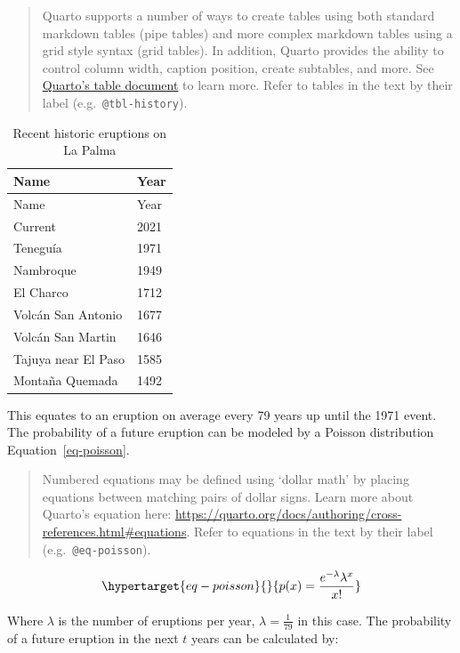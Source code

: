 \documentclass[
]{agujournal2019}
\begin{document}
\begin{quote}
Quarto supports a number of ways to create tables using both standard
markdown tables (pipe tables) and more complex markdown tables using a
grid style syntax (grid tables). In addition, Quarto provides the
ability to control column width, caption position, create subtables, and
more. See \href{https://quarto.org/docs/authoring/tables.html}{Quarto's
table document} to learn more. Refer to tables in the text by their
label (e.g.~\texttt{@tbl-history}).
\end{quote}

\hypertarget{tbl-history}{}
\begin{longtable}[]{@{}ll@{}}
\caption{\label{tbl-history}Recent historic eruptions on La
Palma}\tabularnewline
\toprule\noalign{}
Name & Year \\
\midrule\noalign{}
\endfirsthead
\toprule\noalign{}
Name & Year \\
\midrule\noalign{}
\endhead
\bottomrule\noalign{}
\endlastfoot
Current & 2021 \\
Teneguía & 1971 \\
Nambroque & 1949 \\
El Charco & 1712 \\
Volcán San Antonio & 1677 \\
Volcán San Martin & 1646 \\
Tajuya near El Paso & 1585 \\
Montaña Quemada & 1492 \\
\end{longtable}

This equates to an eruption on average every 79 years up until the 1971
event. The probability of a future eruption can be modeled by a Poisson
distribution Equation~\ref{eq-poisson}.

\begin{quote}
Numbered equations may be defined using `dollar math' by placing
equations between matching pairs of dollar signs. Learn more about
Quarto's equation here:
\url{https://quarto.org/docs/authoring/cross-references.html\#equations}.
Refer to equations in the text by their label
(e.g.~\texttt{@eq-poisson}).
\end{quote}

\begin{equation}\protect\hypertarget{eq-poisson}{}{
p(x)=\frac{e^{-\lambda} \lambda^{x}}{x !}
}\label{eq-poisson}\end{equation}

Where \(\lambda\) is the number of eruptions per year,
\(\lambda=\frac{1}{79}\) in this case. The probability of a future
eruption in the next \(t\) years can be calculated by:
\end{document}
